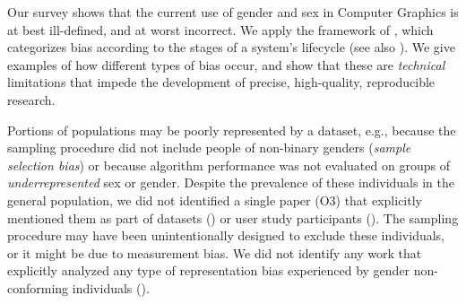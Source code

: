 \documentclass[nonacm,sigconf,review,balance=false]{acmart}
\begin{document}
Our survey shows that the current use of gender and sex in Computer Graphics is at best ill-defined, and at worst incorrect.
We apply the framework of \citet{Suresh2021}, which categorizes bias according to the stages of a system's lifecycle 
(see also \cite{fairnesssurvey,FriedmanAndNissenbaum,olteanu2019social}).
We give examples of how different types of bias occur, and show that these are \emph{technical} limitations that impede the development of precise, high-quality, reproducible research.

 Portions of populations may be poorly represented by a dataset, e.g., because the sampling procedure did not include people of non-binary genders (\emph{sample selection bias}) or because algorithm performance was not evaluated on groups of \emph{underrepresented} sex or gender. Despite the prevalence of these individuals in the general population, we did not identified a single paper (O3) that explicitly mentioned them as part of datasets (\dataset) or user study participants (\userstudy). The sampling procedure may have been unintentionally designed to exclude these individuals, or it might be due to measurement bias. We did not identify any work that explicitly analyzed any type of representation bias experienced by gender non-conforming individuals (\binary).
\end{document}
